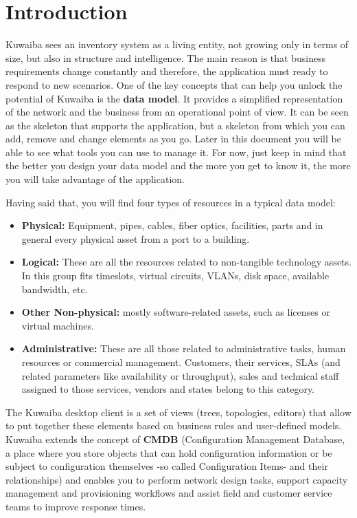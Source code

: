 \documentclass[a4paper]{article}
\begin{document}
	\newpage
	\section{Introduction}
	Kuwaiba sees an inventory system as a living entity, not growing only in terms of size, but also in structure and intelligence. The main reason is that business requirements change constantly and therefore, the application must ready to respond to new scenarios. One of the key concepts that can help you unlock the potential of Kuwaiba is the \textbf{data model}. It provides a simplified representation of the network and the business from an operational point of view. It can be seen as the skeleton that supports the application, but a skeleton from which you can add, remove and change elements as you go. Later in this document you will be able to see what tools you can use to manage it. For now, just keep in mind that the better you design your data model and the more you get to know it, the more you will take advantage of the application.\newline
	
	Having said that, you will find four types of resources in a typical data model:
	\begin{itemize}
		\item \textbf{Physical:} Equipment, pipes, cables, fiber optics, facilities, parts and in general every physical asset from a port to a building. 
		\item \textbf{Logical:} These are all the resources related to non-tangible technology assets. In this group fits timeslots, virtual circuits, VLANs, disk space, available bandwidth, etc.
		\item \textbf{Other Non-physical:} mostly software-related assets, such as licenses or virtual machines.
		\item \textbf{Administrative:} These are all those related to administrative tasks, human resources or commercial management. Customers, their services, SLAs (and related parameters like availability or throughput), sales and technical staff assigned to those services, vendors and states belong to this category.
	\end{itemize}
	The Kuwaiba desktop client is a set of views (trees, topologies, editors) that allow to put together these elements based on business rules and  user-defined models. Kuwaiba extends the concept of \textbf{CMDB} (Configuration Management Database, a place where you store objects that can hold configuration information or be subject to configuration themselves -so called Configuration Items- and their relationships)  and enables you to perform network design tasks, support capacity management and provisioning workflows and assist field and customer service teams to improve response times.\newline
	
\end{document}
